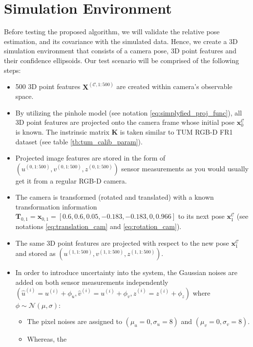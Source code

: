 \documentclass[a4paper]{report}
\numberwithin{figure}{section}
\begin{document}
\section{Simulation Environment}\label{sc_sim_env}

Before testing the proposed algorithm, we will validate the relative 
pose estimation, and its covariance with the simulated data. Hence, 
we create a 3D simulation environment that consists of a camera pose, 
3D point features and their confidence ellipsoids. Our test scenario 
will be comprised of the following steps:

\begin{itemize}
  \item 500 3D point features $\mathbf{X}^{(\mathcal{C}, 1:500)}$ are created 
  within camera's observable space.
  \item By utilizing the pinhole model (see notation 
  \eqref{eq:simplyfied_proj_func}), 
    all 3D point features are projected 
    onto the camera frame whose initial pose $\mathbf{x}_0^{\mathcal{C}}$ is known. 
    The instrinsic matrix $\mathbf{K}$ is taken similar to TUM RGB-D FR1  
    dataset (see table \ref{tb:tum_calib_param}).
  \item Projected image features are stored in the form of 
    $(u^{(0, 1:500)}, v^{(0, 1:500)},z^{(0, 1:500)})$ sensor 
    measurements as you would usually get it from 
      a regular RGB-D camera. 
    \item The camera is transformed (rotated and translated) with a known transformation information 
      $\mathbf{T}_{0,1} = \mathbf{x}_{0,1} = [0.6, 0.6, 0.05, -0.183, -0.183, 0, 0.966]$ 
      to its next pose $\mathbf{x}_1^{\mathcal{C}}$ 
      (see notations \eqref{eq:translation_cam} and \eqref{eq:rotation_cam}).
    \item The same 3D point features are projected with respect to the new pose 
      $\mathbf{x}_1^{\mathcal{C}}$ 
      and stored as $(u^{(1, 1:500)}, v^{(1, 1:500)},z^{(1, 1:500)})$.
    \item In order to introduce uncertainty into the system, the Gaussian 
      noises are added on both sensor measurements independently
      $(\hat{u}^{(i)}=u^{(i)}+\phi_u, 
        \hat{v}^{(i)}=u^{(i)}+\phi_v,
      \hat{z}^{(i)}=z^{(i)}+\phi_z)$ where $\phi\sim\mathcal{N}(\mu,\sigma)$:
      \begin{itemize}
          \item The pixel noises are
            assigned to $(\mu_u=0,\sigma_u=8)$ and $(\mu_v=0,\sigma_v=8)$. 
          \item Whereas, the 

\end{itemize}
\end{itemize}
\end{document}
